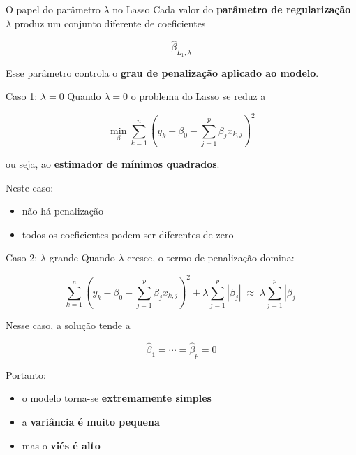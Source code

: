 \documentclass[
  ignorenonframetext,
  aspectratio=169,
]{beamer}
\providecommand{\tightlist}{%
  \setlength{\itemsep}{0pt}\setlength{\parskip}{0pt}}
\begin{document}
\begin{frame}
\begin{block}{O papel do parâmetro \(\lambda\) no Lasso}
\label{o-papel-do-paruxe2metro-lambda-no-lasso}
Cada valor do \textbf{parâmetro de regularização \(\lambda\)} produz um
conjunto diferente de coeficientes

\[
\hat{\beta}_{L_1,\lambda}
\]

Esse parâmetro controla o \textbf{grau de penalização aplicado ao
modelo}.
\end{block}
\end{frame}

\begin{frame}
\begin{block}{Caso 1: \(\lambda = 0\)}
\label{caso-1-lambda-0}
Quando \(\lambda = 0\) o problema do Lasso se reduz a

\[
\min_\beta \sum_{k=1}^{n}
\left(
y_k - \beta_0 - \sum_{j=1}^{p}\beta_j x_{k,j}
\right)^2
\]

ou seja, ao \textbf{estimador de mínimos quadrados}.

Neste caso:

\begin{itemize}
\tightlist
\item
  não há penalização
\item
  todos os coeficientes podem ser diferentes de zero
\end{itemize}
\end{block}
\end{frame}

\begin{frame}
\begin{block}{Caso 2: \(\lambda\) grande}
\label{caso-2-lambda-grande}
Quando \(\lambda\) cresce, o termo de penalização domina:

\[
\sum_{k=1}^{n}
\left(
y_k - \beta_0 - \sum_{j=1}^{p}\beta_j x_{k,j}
\right)^2
+
\lambda \sum_{j=1}^{p} |\beta_j|
\;\approx\;
\lambda \sum_{j=1}^{p} |\beta_j|
\]

Nesse caso, a solução tende a

\[
\hat{\beta}_1 = \cdots = \hat{\beta}_p = 0
\]

Portanto:

\begin{itemize}
\tightlist
\item
  o modelo torna-se \textbf{extremamente simples}
\item
  a \textbf{variância é muito pequena}
\item
  mas o \textbf{viés é alto}
\end{itemize}
\end{block}
\end{frame}
\end{document}
